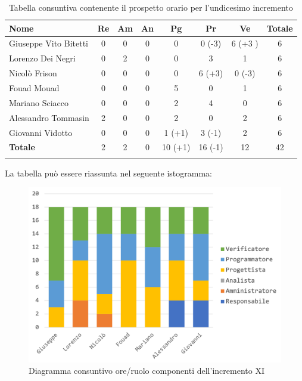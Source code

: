 		\begin{longtable}{|l|c|c|c|c|c|c|c|}
			\hline
			\rowcolor{lighter-grayer}
			\textbf{Nome} & \textbf{Re} & \textbf{Am} & \textbf{An} & \textbf{Pg}  & \textbf{Pr}   & \textbf{Ve} & \textbf{Totale} \\
			\hline
			\endfirsthead
			
			\hline
			Giuseppe Vito Bitetti 		 & 0 & 0 & 0 & 0 & 0 (-3) & 6 (+3 )& 6\\
			\hline
			\hline
			Lorenzo Dei Negri			 & 0 & 2 & 0 & 0 & 3 & 1 & 6\\
			\hline
			\hline
			Nicolò Frison				      & 0 & 0 & 0 & 0 & 6 (+3) & 0 (-3) & 6\\
			\hline
			\hline
			Fouad Mouad 				   & 0 & 0 & 0 & 5 & 0 & 1 & 6\\
			\hline
			\hline
			Mariano Sciacco 			 & 0 & 0 & 0 & 2 & 4 & 0 & 6\\
			\hline
			\hline
			Alessandro Tommasin    & 2 & 0 & 0 & 2 & 0 & 2 & 6\\
			\hline
			\hline
			Giovanni Vidotto 			  & 0 & 0 & 0 & 1 (+1) & 3 (-1) & 2 & 6\\
			\hline 
			\textbf{Totale}			 		& 2 & 2 & 0 & 10 (+1) & 16 (-1) & 12 & 42\\
			\hline
			\caption{Tabella consuntiva contenente il prospetto orario per l'undicesimo incremento}
		\end{longtable}
		
		La tabella può essere riassunta nel seguente istogramma:
		\begin{figure}[H]
			\centering
			\includegraphics[width=0.8\linewidth]{./images/consuntivo/ConsIncr11-1.png}
			\caption{Diagramma consuntivo ore/ruolo componenti dell'incremento XI}
			\label{fig:consuntivo diagramma suddivione ruoli incremento XI}
		\end{figure}
		\pagebreak
		

